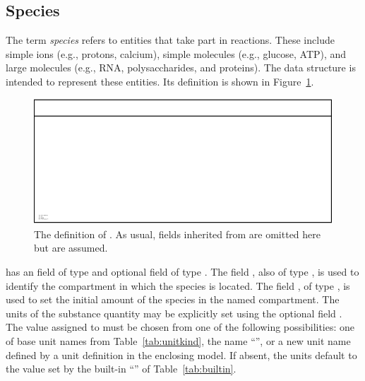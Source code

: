 \documentclass[10pt,twocolumntoc]{cekarticle}
\newcommand{\vref}[1]{\ref{#1}}
\begin{document}
\subsection{Species}
\label{sec:species}

The term \emph{species} refers to entities that take part in reactions.
These include simple ions (e.g., protons, calcium), simple molecules (e.g.,
glucose, ATP), and large molecules (e.g., RNA, polysaccharides, and
proteins).  The  data structure is intended to represent
these entities.  Its definition is shown in Figure~\vref{fig:species}.

\begin{figure}[htb]
  \centering
  \includegraphics[scale = 0.68]{specie}
  \caption{The definition of .  As usual, fields inherited from
     are omitted here but are assumed.}
  \label{fig:species}
\end{figure}

 has an  field of type  and optional
 field of type .  The field
, also of type , is used to identify the
compartment in which the species is located.  The field
, of type , is used to set the initial
amount of the species in the named compartment.  The units of the substance
quantity may be explicitly set using the optional field .  The
value assigned to  must be chosen from one of the following
possibilities: one of base unit names from Table~\vref{tab:unitkind}, the
name ``'', or a new unit name defined by a unit
definition in the enclosing model.  If absent, the units default to the
value set by the built-in ``'' of
Table~\vref{tab:builtin}.
\end{document}
